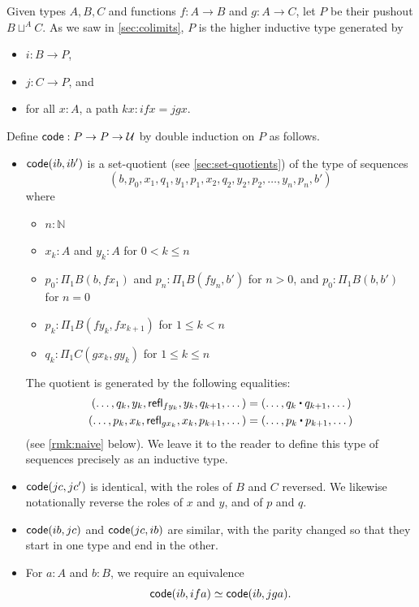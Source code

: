 Given types $A,B,C$ and functions $f:A\to B$ and $g:A\to C$, let $P$ be their pushout $B\sqcup^A C$.
As we saw in \cref{sec:colimits}, $P$ is the higher inductive type generated by
\begin{itemize}
\item $i:B\to P$,
\item $j:C\to P$, and
\item for all $x:A$, a path $k x:ifx = jgx$.
\end{itemize}
Define $\mathsf{code}:P\to P\to \mathcal{U}$ by double induction on $P$ as follows.
\begin{itemize}
\item $\mathsf{code}(ib,ib')$ is a set-quotient (see \cref{sec:set-quotients}) of the type of sequences %
  \[ (b, p_0, x_1, q_1, y_1, p_1, x_2, q_2, y_2, p_2, \dots, y_n, p_n, b') \]
  where
  \begin{itemize}
  \item $n:\mathbb{N}$
  \item $x_k:A$ and $y_k:A$ for $0<k \le n$
  \item $p_0:\Pi_1B(b,f x_1)$ and $p_n:\Pi_1B(f y_n, b')$ for $n>0$, and $p_0:\Pi_1B(b,b')$ for $n=0$
  \item $p_k:\Pi_1B(f y_k, fx_{k+1})$ for $1\le k < n$
  \item $q_k:\Pi_1C(gx_k, gy_k)$ for $1\le k\le n$
  \end{itemize}
  The quotient is generated by the following equalities:
  \begin{align*}
    (\dots, q_k, y_k, \refl{fy_k}, y_k, q_{k+1},\dots)
    &= (\dots, q_k\ct q_{k+1},\dots)\\
    (\dots, p_k, x_k, \refl{gx_k}, x_k, p_{k+1},\dots)
    &= (\dots, p_k\ct p_{k+1},\dots)
  \end{align*}
  (see \cref{rmk:naive} below).
  We leave it to the reader to define this type of sequences precisely as an inductive type.
\item $\mathsf{code}(jc,jc')$ is identical, with the roles of $B$ and $C$ reversed.
  We likewise notationally reverse the roles of $x$ and $y$, and of $p$ and $q$.
\item $\mathsf{code}(ib,jc)$ and $\mathsf{code}(jc,ib)$ are similar, with the parity changed so that they start in one type and end in the other.
\item For $a:A$ and $b:B$, we require an equivalence
  \begin{equation}
    \mathsf{code}(ib, ifa) \simeq \mathsf{code}(ib,jga).\label{eq:bfa-bga}
  \end{equation}

\end{itemize}
